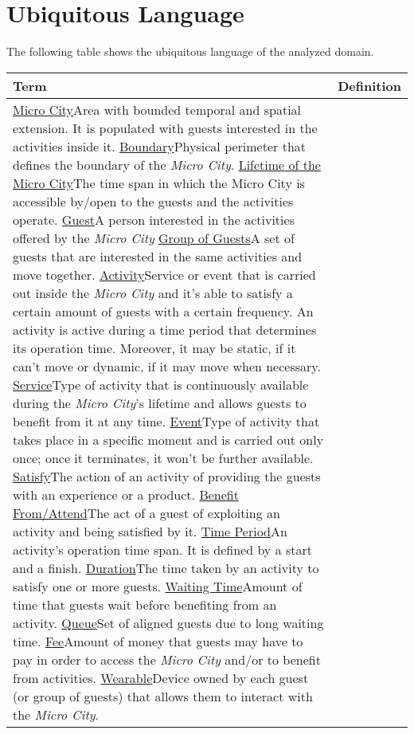 \section{Ubiquitous Language}\label{sec:ubiquitous-language}

The following table shows the ubiquitous language of the analyzed domain.

\begin{table}[H]
    \centering
    \begin{tabular}{|l|p{}|}
        \hline
        \textbf{Term} & \textbf{Definition}\\
        \hline
        \ul{Micro City}{Area with bounded temporal and spatial extension. It is populated with guests interested in the activities inside it.}
        \ul{Boundary}{Physical perimeter that defines the boundary of the \textit{Micro City}.}
        \ul{Lifetime of the Micro City}{The time span in which the Micro City is accessible by/open to the guests and the activities operate.}
        \ul{Guest}{A person interested in the activities offered by the \textit{Micro City}}
        \ul{Group of Guests}{A set of guests that are interested in the same activities and move together.}
        \ul{Activity}{Service or event that is carried out inside the \textit{Micro City} and it's able to satisfy a certain amount of guests with a certain frequency. An activity is active during a time period that determines its operation time. Moreover, it may be static, if it can't move or dynamic, if it may move when necessary.}
        \ul{Service}{Type of activity that is continuously available during the \textit{Micro City}'s lifetime and allows guests to benefit from it at any time.}
        \ul{Event}{Type of activity that takes place in a specific moment and is carried out only once; once it terminates, it won't be further available.}
        \ul{Satisfy}{The action of an activity of providing the guests with an experience or a product.}
        \ul{Benefit From/Attend}{The act of a guest of exploiting an activity and being satisfied by it.}
        \ul{Time Period}{An activity's operation time span. It is defined by a start and a finish.}
        \ul{Duration}{The time taken by an activity to satisfy one or more guests.}
        \ul{Waiting Time}{Amount of time that guests wait before benefiting from an activity.}
        \ul{Queue}{Set of aligned guests due to long waiting time.}
        \ul{Fee}{Amount of money that guests may have to pay in order to access the \textit{Micro City} and/or to benefit from activities.}
        \ul{Wearable}{Device owned by each guest (or group of guests) that allows them to interact with the \textit{Micro City}.}

\end{tabular}
\end{table}
